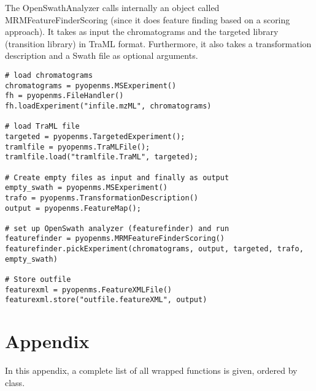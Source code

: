 \documentclass[10pt]{article}
\begin{document}
The OpenSwathAnalyzer calls internally an object called
MRMFeatureFinderScoring (since it does feature finding based on a scoring
approach). It takes as input the chromatograms and the targeted library
(transition library) in TraML format. Furthermore, it also takes a
transformation description and a Swath file as optional arguments.

\begin{verbatim}
# load chromatograms
chromatograms = pyopenms.MSExperiment()
fh = pyopenms.FileHandler()
fh.loadExperiment("infile.mzML", chromatograms)

# load TraML file
targeted = pyopenms.TargetedExperiment();
tramlfile = pyopenms.TraMLFile();
tramlfile.load("tramlfile.TraML", targeted);

# Create empty files as input and finally as output
empty_swath = pyopenms.MSExperiment()
trafo = pyopenms.TransformationDescription()
output = pyopenms.FeatureMap();

# set up OpenSwath analyzer (featurefinder) and run
featurefinder = pyopenms.MRMFeatureFinderScoring()
featurefinder.pickExperiment(chromatograms, output, targeted, trafo, empty_swath)

# Store outfile
featurexml = pyopenms.FeatureXMLFile()
featurexml.store("outfile.featureXML", output)
\end{verbatim}

\section{Appendix}
In this appendix, a complete list of all wrapped functions is given, ordered
by class.

\end{document}
